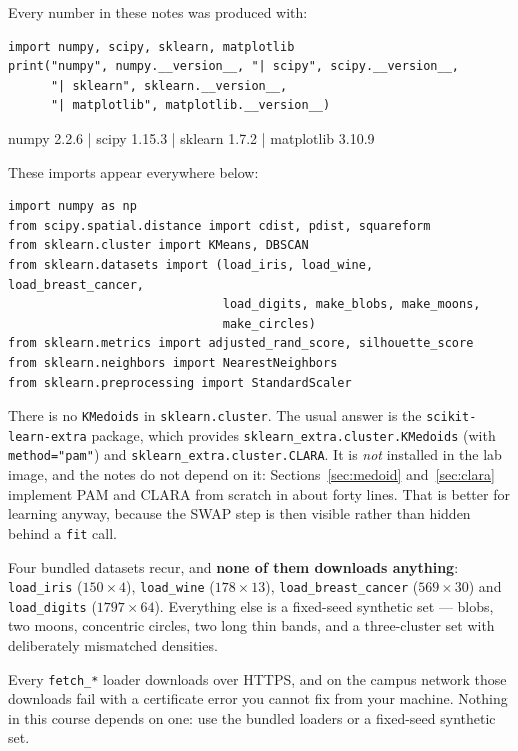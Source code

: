 \documentclass[11pt]{article}
\begin{document}
Every number in these notes was produced with:

\begin{lstlisting}
import numpy, scipy, sklearn, matplotlib
print("numpy", numpy.__version__, "| scipy", scipy.__version__,
      "| sklearn", sklearn.__version__,
      "| matplotlib", matplotlib.__version__)
\end{lstlisting}
\begin{codeout}
numpy 2.2.6 | scipy 1.15.3 | sklearn 1.7.2 | matplotlib 3.10.9
\end{codeout}

These imports appear everywhere below:

\begin{lstlisting}
import numpy as np
from scipy.spatial.distance import cdist, pdist, squareform
from sklearn.cluster import KMeans, DBSCAN
from sklearn.datasets import (load_iris, load_wine, load_breast_cancer,
                              load_digits, make_blobs, make_moons,
                              make_circles)
from sklearn.metrics import adjusted_rand_score, silhouette_score
from sklearn.neighbors import NearestNeighbors
from sklearn.preprocessing import StandardScaler
\end{lstlisting}

\begin{caution}
There is no \texttt{KMedoids} in \texttt{sklearn.cluster}. The usual answer is
the \texttt{scikit-learn-extra} package, which provides
\texttt{sklearn\_extra.cluster.KMedoids} (with \texttt{method="pam"}) and
\texttt{sklearn\_extra.cluster.CLARA}. It is \emph{not} installed in the lab
image, and the notes do not depend on it: Sections~\ref{sec:medoid}
and~\ref{sec:clara} implement PAM and CLARA from scratch in about forty lines.
That is better for learning anyway, because the SWAP step is then visible
rather than hidden behind a \texttt{fit} call.
\end{caution}

Four bundled datasets recur, and \textbf{none of them downloads anything}:
\texttt{load\_iris} ($150 \times 4$), \texttt{load\_wine} ($178 \times 13$),
\texttt{load\_breast\_cancer} ($569 \times 30$) and \texttt{load\_digits}
($1797 \times 64$). Everything else is a fixed-seed synthetic set --- blobs,
two moons, concentric circles, two long thin bands, and a three-cluster set
with deliberately mismatched densities.

\begin{caution}
Every \texttt{fetch\_*} loader downloads over HTTPS, and on the campus network
those downloads fail with a certificate error you cannot fix from your machine.
Nothing in this course depends on one: use the bundled loaders or a fixed-seed
synthetic set.
\end{caution}
\end{document}
